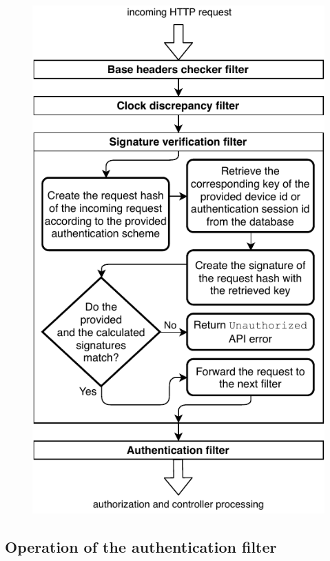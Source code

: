 \begin{figure}[!htb]
    \centering
    \includegraphics[height=\textheight-1cm]{figures/signature-verification-filter.pdf}
\end{figure}

\newpage

\subsection{Operation of the authentication filter}

